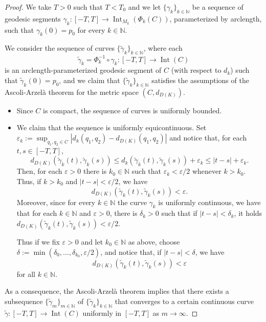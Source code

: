 \documentclass[11pt]{article}
\theoremstyle{definition}
\theoremstyle{remark}
\theoremstyle{plain}
\DeclareMathOperator{\Int}{Int}
\newcommand{\N}{\mathbb{N}}
\begin{document}
\begin{proof}

We take $T>0$ such that $T<T_0$ and we let $\{\gamma_k\}_{k\in \N}$ be a sequence of geodesic segments $\gamma_k:[-T,T]\rightarrow \Int_{M_k}(\Phi_k(C))$, parameterized by arclength, such that $\gamma_k(0)=p_0$ for every $k\in \N$.

We consider the sequence of curves $\{\tilde \gamma_k\}_{k\in\N}$, where each
$$\tilde\gamma_k= \Phi_k^{-1}\circ \gamma_k : [-T,T]\to \Int(C)$$
is an arclength-parameterized geodesic segment of $C$ (with respect to $d_k$) such that $\tilde\gamma_k(0) = p_0$, and we claim that $\{\tilde\gamma_k\}_{k\in \N}$ satisfies the assumptions of the Ascoli-Arzelà theorem for the metric space $(C, d_{D(K)})$.

\begin{itemize}
    \item Since $C$ is compact, the sequence of curves is uniformly bounded.
    \item We claim that the sequence is uniformly equicontinuous. Set $\varepsilon_k:=\sup_{q_1,q_2\in C}|d_k(q_1,q_2)-d_{D(K)}(q_1,q_2)|$ and notice that, for each $t,s\in [-T,T]$,
        $$d_{D(K)}(\tilde\gamma_k(t),\tilde\gamma_k(s)) \le d_k(\tilde\gamma_k(t),\tilde\gamma_k(s)) + \varepsilon_k\le |t-s| + \varepsilon_k.$$
        Then, for each $\varepsilon>0$ there is $k_0\in \N$ such that $\varepsilon_k<\varepsilon/2$ whenever $k>k_0$. Thus, if $k>k_0$ and $|t-s|< \varepsilon/2$, we have
        $$d_{D(K)}(\tilde\gamma_k(t),\tilde\gamma_k(s)) < \varepsilon.$$
        Moreover, since for every $k\in \N$ the curve $\gamma_k$ is uniformly continuous, we have that for each $k\in \N$ and $\varepsilon>0$, there is $\delta_k>0$ such that if $|t-s|<\delta_k$, it holds $d_{D(K)}(\tilde\gamma_k(t),\tilde\gamma_k(s))<\varepsilon/2$. 
         
        Thus if we fix $\varepsilon>0$ and let $k_0\in \N$ as above, choose $\delta := \min(\delta_0,\ldots,\delta_{k_0},\varepsilon/2)$, and notice that, if $|t-s|<\delta$, we have
        $$d_{D(K)}(\tilde\gamma_k(t),\tilde\gamma_k(s))<\varepsilon$$
        for all $k\in \N$. 
        
\end{itemize}

As a consequence, the Ascoli-Arzelà theorem implies that there exists a subsequence $\{\tilde\gamma_m\}_{m\in \N}$ of $\{\tilde\gamma_k\}_{k\in \N}$ that converges to a certain continuous curve $\tilde\gamma : [-T,T]\rightarrow \Int(C)$ uniformly in $[-T,T]$ as $m\rightarrow \infty$. 


\end{proof}
\end{document}
